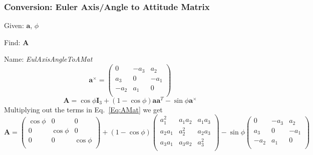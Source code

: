 \subsubsection{Conversion:  Euler Axis/Angle to Attitude Matrix}  \label{Sec:EulerAxis/AngleToAMat}

Given:  $\mathbf{a}$, $\phi$

\noindent Find:  $\mathbf{A}$

\noindent Name:  \emph{EulAxisAngleToAMat}
%
\begin{equation}
     \mathbf{a}^{\times} = \begin{pmatrix}
           0  & -a_3 &  a_2 \\
          a_3 &   0  & -a_1 \\
         -a_2 &  a_1 &   0  \\
     \end{pmatrix}
\end{equation}
\medskip
%
\begin{equation}
    \mathbf{A} = \cos{\phi}\mathbf{I}_3 +
    (1 - \cos{\phi})\mathbf{a}\mathbf{a}^T -
    \sin{\phi}\mathbf{a}^{\times}
    \label{Eq:AMat}
\end{equation}
%
Multiplying out the terms in Eq.~\ref{Eq:AMat} we get
%
\begin{equation}
    \mathbf{A} =
        \begin{pmatrix}
            \cos{\phi} &     0      &     0      \\
                0      & \cos{\phi} &     0      \\
                0      &     0      & \cos{\phi} \\
        \end{pmatrix} +
        (1 - \cos{\phi})
        \begin{pmatrix}
            a_1^2   & a_1 a_2 & a_1 a_3 \\
            a_2 a_1 & a_2^2   & a_2 a_3 \\
            a_3 a_1 & a_3 a_2 & a_3^2   \\
        \end{pmatrix} -
        \sin{\phi}
        \begin{pmatrix}
           0  & -a_3 &  a_2 \\
          a_3 &   0  & -a_1 \\
         -a_2 &  a_1 &   0  \\
        \end{pmatrix}
    \label{Eq:AMat2}
\end{equation}
